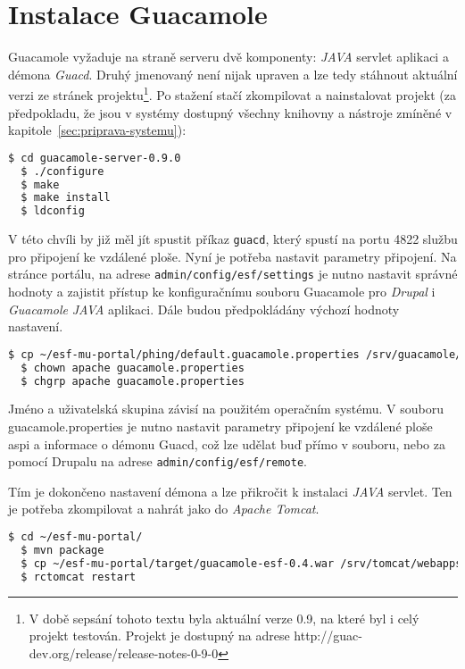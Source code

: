 \section{Instalace Guacamole}
Guacamole vyžaduje na straně serveru dvě komponenty: \emph{JAVA} \gls{servlet} aplikaci a démona \emph{Guacd}. Druhý jmenovaný není nijak upraven a lze tedy stáhnout aktuální verzi ze stránek projektu\footnote{V době sepsání tohoto textu byla aktuální verze 0.9, na které byl i celý projekt testován. Projekt je dostupný na adrese http://guac-dev.org/release/release-notes-0-9-0}. Po stažení stačí zkompilovat a nainstalovat projekt (za předpokladu, že jsou v systémy dostupný všechny knihovny a nástroje zmíněné v kapitole~\ref{sec:priprava-systemu}):

\begin{lstlisting}[language=bash]
  $ cd guacamole-server-0.9.0
  $ ./configure
  $ make
  $ make install
  $ ldconfig
\end{lstlisting}

V této chvíli by již měl jít spustit příkaz \texttt{guacd}, který spustí na portu 4822 službu pro připojení ke vzdálené ploše. Nyní je potřeba nastavit parametry připojení. Na stránce portálu, na adrese \texttt{admin/config/esf/settings} je nutno nastavit správné hodnoty a zajistit přístup ke konfiguračnímu souboru Guacamole pro \emph{Drupal} i \emph{Guacamole} \emph{JAVA} aplikaci. Dále budou předpokládány výchozí hodnoty nastavení.

\begin{lstlisting}[language=bash]
  $ cp ~/esf-mu-portal/phing/default.guacamole.properties /srv/guacamole/guacamole.properties
  $ chown apache guacamole.properties 
  $ chgrp apache guacamole.properties 
\end{lstlisting}

Jméno a uživatelská skupina závisí na použitém operačním systému. V souboru guacamole.properties je nutno nastavit parametry připojení ke vzdálené ploše \gls{aspi} a informace o démonu Guacd, což lze udělat buď přímo v souboru, nebo za pomocí Drupalu na adrese \texttt{admin/config/esf/remote}. 

Tím je dokončeno nastavení démona a lze přikročit k instalaci \emph{JAVA} \gls{servlet}. Ten je potřeba zkompilovat a nahrát jako do \emph{Apache Tomcat}.

\begin{lstlisting}[language=bash]
  $ cd ~/esf-mu-portal/
  $ mvn package
  $ cp ~/esf-mu-portal/target/guacamole-esf-0.4.war /srv/tomcat/webapps/
  $ rctomcat restart

\end{lstlisting}

